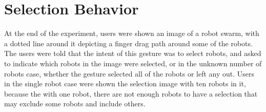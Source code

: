 \section{Selection Behavior} \label{section:Selection_Strategy}

At the end of the experiment, users were shown an image of a robot swarm, with a dotted line around it depicting a finger drag path around some of the robots. 
The users were told that the intent of this gesture was to select robots, and asked to indicate which robots in the image were selected, or in the unknown number of robots case, whether the gesture selected all of the robots or left any out. 
Users in the single robot case were shown the selection image with ten robots in it, because the with one robot, there are not enough robots to have a selection that may exclude some robots and include others. 


